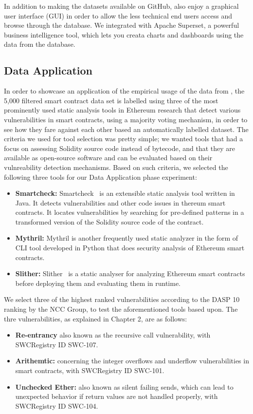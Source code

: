 	In addition to making the datasets available on GitHub, \etherbase also enjoy a graphical user interface (GUI) in order to allow the less technical end users access
	and browse through the database.
	We integrated \etherbase with Apache Superset, a powerful business intelligence tool, which lets you creata charts and dashboards using the data from the database.

\subsection{Data Application}
	In order to showcase an application of the empirical usage of the data from \etherbase, 
	the 5,000 filtered smart contract data set is labelled using three of the most prominently used static analysis tools in Ethereum research that detect
	various vulnerabilities in smart contracts, using a majority voting mechanism, in order to see how they fare against each other based an automatically labelled dataset.
	The criteria we used for tool selection was pretty simple; we wanted tools that had a focus on assessing Solidity source code instead of bytecode,
	and that they are available as open-source software and can be evaluated based on their vulnreability detection mechanisms.
	Based on such criteria, we selected the following three tools for our Data Application phase experiment:
	\begin{itemize}
		\item \textbf{Smartcheck:} Smartcheck~\cite{smartcheck} is an extensible static analysis tool written in Java. It detects vulnerabilities and other code issues in thereum smart contracts. It locates vulnerabilities by searching for pre-defined patterns in a transformed version of the Solidity source code of the contract.
		\item \textbf{Mythril:} Mythril is another frequently used static analyzer in the form of CLI tool developed in Python that does security analysis of Ethereum smart contracts.
		\item \textbf{Slither:} Slither~\cite{slither} is a static analyser for analyzing Ethereum smart contracts before deploying them and evaluating them in runtime.
	\end{itemize}
	
	
	We select three of the highest ranked vulnerabilities according to the DASP 10 ranking by the NCC Group, to test the aforementioned tools based upon.
	The thre vulnerabilities, as explained in Chapter 2, are as follows:
	\begin{itemize}
		\item \textbf{Re-entrancy} also known as the recursive call vulnerability, with SWCRegistry ID SWC-107.
		\item \textbf{Arithemtic:} concerning the integer overflows and underflow vulnerabilities in smart contracts, with SWCRegistry ID SWC-101.
		\item \textbf{Unchecked Ether:} also known as silent failing sends, which can lead to unexpected behavior if return values are not handled properly, with SWCRegistry ID SWC-104.~\cite{dasp}
	\end{itemize} 
	
